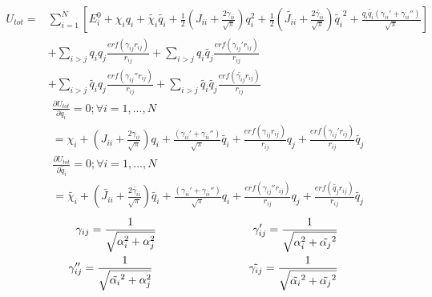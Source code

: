\documentclass[12pt,english]{article}
\begin{document}
	\begin{equation}
	\begin{split}
		U_{tot}  = &\sum_{i=1}^{N} [E_i^0 + \chi_i q_i + \tilde{\chi_i}\tilde{q_i }+ \frac{1}{2}(J_{ii}+\frac{2\gamma_{ii}}{\sqrt{\pi}})q_i^2 + \frac{1}{2}(\tilde{J_{ii}}+\frac{2\tilde{\gamma_{ii}}}{\sqrt{\pi}})\tilde{q_i}^2+\frac{q_i\tilde{q_i }(\gamma_{ii}'+\gamma_{ii}'')}{\sqrt{\pi}}]\\ 
		&+\sum_{i>j} q_iq_j\frac{erf(\gamma_{ij}r_{ij})}{r_{ij}} + \sum_{i>j} q_i\tilde{q_j}\frac{erf(\gamma_{ij}'r_{ij})}{r_{ij}}\\
		 &+\sum_{i>j}\tilde{q_i }q_j \frac{erf(\gamma_{ij}''r_{ij})}{r_{ij}} + \sum_{i>j}\tilde{q_i}\tilde{q_j} \frac{erf(\tilde{\gamma_{ij}}r_{ij})}{r_{ij}}
	\end{split}
	\end{equation}
	\newline
	\begin{equation}
		\begin{split}
			&\frac{\partial U_{tot}}{\partial q_i}=0 ; \forall i = 1 ,...,N \\
			& = \chi_i 
			+ (J_{ii}+\frac{2\gamma_{ii}}{\sqrt{\pi}})q_i 
			+ \frac{(\gamma_{ii}'+ \gamma_{ii}'')}{\sqrt{\pi}}\tilde{q_i} 
			+ \frac{erf(\gamma_{ij}r_{ij})}{r_{ij}}q_j 
			+ \frac{erf(\gamma_{ij}'r_{ij})}{r_{ij}}\tilde{q_j}
		\end{split}
	\end{equation}
	\begin{equation}
		\begin{split}
			&\frac{\partial U_{tot}}{\partial \tilde{q_i}}=0 ; \forall i = 1 ,..., N  \\
			& = \tilde{\chi_i} 
			+ (\tilde{J_{ii}} + \frac{2\tilde{\gamma_{ii}}}{\sqrt{\pi}})\tilde{q_i } 
			+ \frac{(\gamma_{ii}' + \gamma_{ii}'')}{\sqrt{\pi}}q_i 
			+ \frac{erf(\gamma_{ij}''r_{ij})}{r_{ij}}q_j 
			+ \frac{erf(\tilde{q_j}r_{ij})}{r_{ij}}\tilde{q_j}
		\end{split}		
	\end{equation}
	\begin{equation}
	\begin{split}
			\gamma_{ij} = \frac{1}{\sqrt{\alpha_i^2+\alpha_j^2}}
			\hspace{0.25\textwidth} 
			\gamma_{ij}'=\frac{1}{\sqrt{\alpha_i^2+\tilde{\alpha_j}^2}}\\	
			\gamma_{ij}''=\frac{1}{\sqrt{\tilde{\alpha_i}^2+\alpha_j^2}}
			\hspace{0.25\textwidth} 
			\tilde{\gamma_{ij}} = \frac{1}{\sqrt{\tilde{\alpha_i}^2+\tilde{\alpha_j}^2}}
	\end{split}
	\end{equation}
\end{document}
